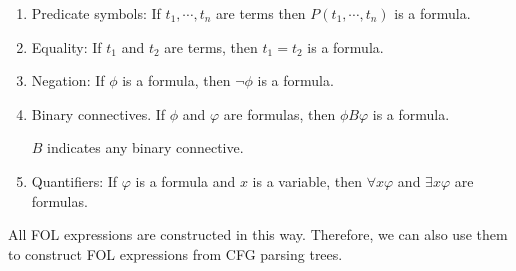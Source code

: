 \documentclass{article}
\begin{document}
{{		\begin{enumerate}
		\item {
			Predicate symbols: If $t_1, \cdots, t_n$ are terms then $P(t_1, \cdots, t_n)$ is a formula. 
		}

		\item {
			Equality: If $t_1$ and $t_2$ are terms, then $t_1 = t_2$ is a formula. 
		}

		\item {
			Negation: If $\phi $ is a formula, then $\neg \phi $ is a formula. 
		}

		\item {
			Binary connectives. If $\phi $ and $\varphi $ are formulas, then $\phi B \varphi $ is a formula. 

			$B$ indicates any binary connective. 
		}

		\item {
			Quantifiers: If $\varphi$ is a formula and $x$ is a variable, then $\forall x \varphi$ and $\exists x \varphi $ are formulas.  
		}
		\end{enumerate}

		All FOL expressions are constructed in this way. Therefore, we can also use them to construct FOL expressions from CFG parsing trees. 
	}
}
\end{document}
